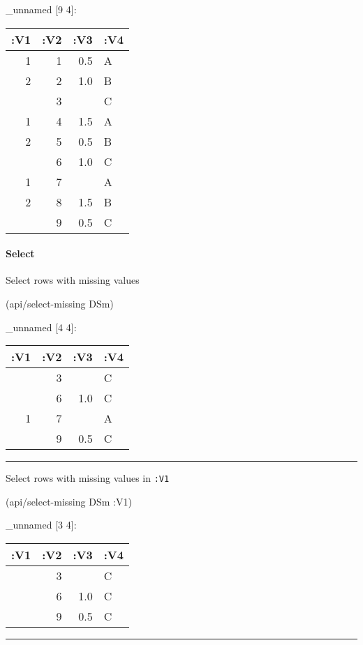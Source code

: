 \documentclass[]{article}
\newenvironment{Shaded}{\begin{snugshade}}{\end{snugshade}}
\newcommand{\AttributeTok}[1]{\textcolor[rgb]{0.77,0.63,0.00}{#1}}
\newcommand{\NormalTok}[1]{#1}
\let\oldparagraph\paragraph
\renewcommand{\paragraph}[1]{\oldparagraph{#1}\mbox{}}
\begin{document}
\_unnamed {[}9 4{]}:

\begin{longtable}[]{@{}rrrl@{}}
\toprule
:V1 & :V2 & :V3 & :V4\tabularnewline
\midrule
\endhead
1 & 1 & 0.5 & A\tabularnewline
2 & 2 & 1.0 & B\tabularnewline
& 3 & & C\tabularnewline
1 & 4 & 1.5 & A\tabularnewline
2 & 5 & 0.5 & B\tabularnewline
& 6 & 1.0 & C\tabularnewline
1 & 7 & & A\tabularnewline
2 & 8 & 1.5 & B\tabularnewline
& 9 & 0.5 & C\tabularnewline
\bottomrule
\end{longtable}

\paragraph{Select}\label{select-2}

Select rows with missing values

\begin{Shaded}
\begin{Highlighting}[]
\NormalTok{(api/select-missing DSm)}
\end{Highlighting}
\end{Shaded}

\_unnamed {[}4 4{]}:

\begin{longtable}[]{@{}rrrl@{}}
\toprule
:V1 & :V2 & :V3 & :V4\tabularnewline
\midrule
\endhead
& 3 & & C\tabularnewline
& 6 & 1.0 & C\tabularnewline
1 & 7 & & A\tabularnewline
& 9 & 0.5 & C\tabularnewline
\bottomrule
\end{longtable}

\begin{center}\rule{0.5\linewidth}{0.5pt}\end{center}

Select rows with missing values in \texttt{:V1}

\begin{Shaded}
\begin{Highlighting}[]
\NormalTok{(api/select-missing DSm }\AttributeTok{:V1}\NormalTok{)}
\end{Highlighting}
\end{Shaded}

\_unnamed {[}3 4{]}:

\begin{longtable}[]{@{}rrrl@{}}
\toprule
:V1 & :V2 & :V3 & :V4\tabularnewline
\midrule
\endhead
& 3 & & C\tabularnewline
& 6 & 1.0 & C\tabularnewline
& 9 & 0.5 & C\tabularnewline
\bottomrule
\end{longtable}

\begin{center}\rule{0.5\linewidth}{0.5pt}\end{center}
\end{document}
